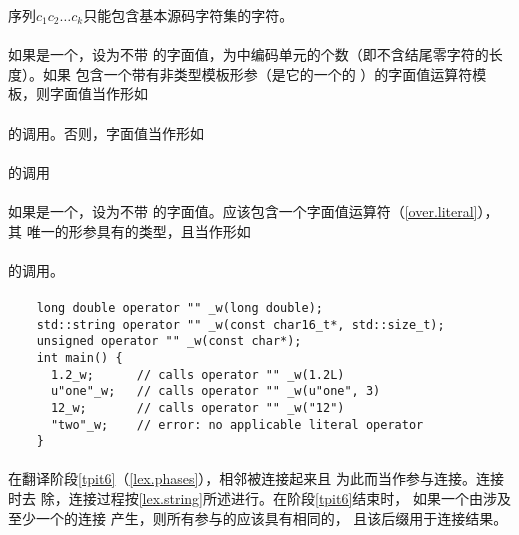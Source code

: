 \begin{note} %
  序列$c_1c_2 \ldots c_k$只能包含基本源码字符集的字符。
\end{note}

\paragraph{} %
如果是一个，设为不带
的字面值，为中编码单元的个数（即不含结尾零字符的长度）。如果
包含一个带有非类型模板形参（是它的一个\wellform{}的
）的字面值运算符模板，则字面值当作形如            \\
\mbox{\qquad{}}                                \\
的调用。否则，字面值当作形如                                            \\
\mbox{\qquad{}}                      \\
的调用

\paragraph{} %
如果是一个，设为不带
的字面值。应该包含一个字面值运算符（\ref{over.literal}），其
唯一的形参具有的类型，且当作形如                                 \\
\mbox{\qquad{}}                                 \\
的调用。

\paragraph{} %
\begin{example} %
  \begin{lstlisting}
    long double operator "" _w(long double);
    std::string operator "" _w(const char16_t*, std::size_t);
    unsigned operator "" _w(const char*);
    int main() {
      1.2_w;      // calls operator "" _w(1.2L)
      u"one"_w;   // calls operator "" _w(u"one", 3)
      12_w;       // calls operator "" _w("12")
      "two"_w;    // error: no applicable literal operator
    }
  \end{lstlisting}
\end{example}

\paragraph{} %
在翻译阶段\ref{tpit6}（\ref{lex.phases}），相邻被连接起来且
为此而当作参与连接。连接时去
除，连接过程按\ref{lex.string}所述进行。在阶段\ref{tpit6}结束时，
如果一个由涉及至少一个的连接
产生，则所有参与的应该具有相同的，
且该后缀用于连接结果。

